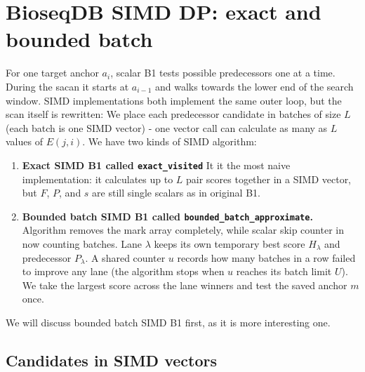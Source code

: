

\section{BioseqDB SIMD DP: exact and bounded batch}
\label{sec:chaining-simd-forward}

For one target anchor \(a_i\), scalar B1 tests possible predecessors one at a
time.  During the sacan it starts at \(a_{i-1}\) and walks towards the lower end of the search
window. SIMD implementations both implement the same outer loop, but the scan itself is rewritten: We place each predecessor candidate in batches of size $L$ (each batch is one SIMD vector) - one vector call can
calculate as many as \(L\) values of \(E(j,i)\). We have two kinds of SIMD algorithm:

\begin{enumerate}
  \item \textbf{Exact SIMD B1 called \texttt{exact\_visited}}
        It it the most naive implementation: it calculates up to \(L\) pair scores together in a SIMD vector, but \(F\), \(P\), and \(s\) are still single scalars as in original B1. 

  \item \textbf{Bounded batch SIMD B1 called
        \texttt{bounded\_batch\_}\allowbreak\texttt{approximate}.}
        Algorithm removes the mark array completely, while scalar skip counter in now counting batches.  Lane \(\lambda\)
        keeps its own temporary best score \(H_\lambda\) and predecessor
        \(P_\lambda\).  A shared counter \(u\) records how many
        batches in a row failed to improve any lane (the algorithm stops when \(u\)
        reaches its batch limit \(U\)). We take the largest score across the lane winners and test the saved
        anchor \(m\) once.
\end{enumerate}

We will discuss bounded batch SIMD B1 first, as it is more interesting one.

\subsection{Candidates in SIMD vectors}

